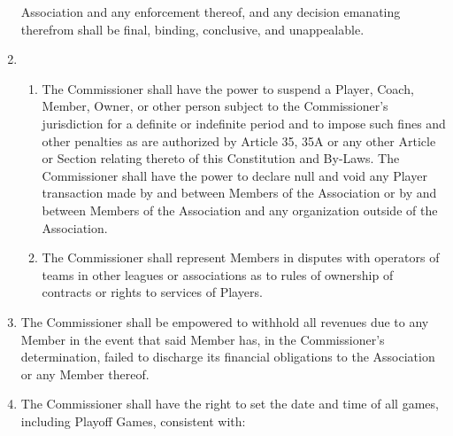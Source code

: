 \documentclass[]{book}
\providecommand{\tightlist}{%
  \setlength{\itemsep}{0pt}\setlength{\parskip}{0pt}}
\theoremstyle{definition}
\theoremstyle{definition}
\theoremstyle{definition}
\theoremstyle{remark}
\begin{document}
\begin{enumerate}
  Association and any enforcement thereof, and any decision emanating
  therefrom shall be final, binding, conclusive, and unappealable.
\item
  \begin{enumerate}
  \def\labelenumii{(\roman{enumii})}
  \tightlist
  \item
    The Commissioner shall have the power to suspend a Player, Coach,
    Member, Owner, or other person subject to the Commissioner's
    jurisdiction for a definite or indefinite period and to impose such
    fines and other penalties as are authorized by Article 35, 35A or
    any other Article or Section relating thereto of this Constitution
    and By-Laws. The Commissioner shall have the power to declare null
    and void any Player transaction made by and between Members of the
    Association or by and between Members of the Association and any
    organization outside of the Association.
  \item
    The Commissioner shall represent Members in disputes with operators
    of teams in other leagues or associations as to rules of ownership
    of contracts or rights to services of Players.
  \end{enumerate}
\item
  The Commissioner shall be empowered to withhold all revenues due to
  any Member in the event that said Member has, in the Commissioner's
  determination, failed to discharge its financial obligations to the
  Association or any Member thereof.
\item
  The Commissioner shall have the right to set the date and time of all
  games, including Playoff Games, consistent with:


\end{enumerate}
\end{document}
